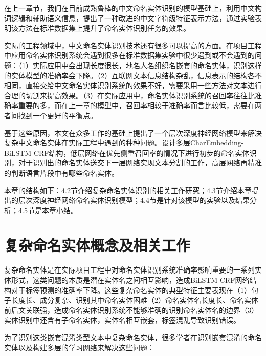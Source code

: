 \documentclass[winfonts,master,oneside,nobackinfo]{njuthesis}
\begin{document}
在上一章节，我们在目前成熟鲁棒的中文命名实体识别的模型基础上，利用中文构词逻辑和辅助语义信息，提出了一种改进的中文字符级特征表示方法，通过实验表明该方法在标准数据集上提升了命名实体识别任务的效果。

实际的工程领域中，中文命名实体识别技术还有很多可以提高的方面。在项目工程中应用命名实体识别系统会遇到很多在标准数据集实验中很少遇到或不会遇到的问题：（1）实际应用中会出现长度很长，地名人名组织名嵌套的命名实体，识别这样的实体模型的准确率会下降。（2）互联网文本信息结构杂乱，信息表示的结构各不相同，直接交给中文命名实体识别系统的效果不好，需要采用一些方法对文本进行合理的切割来提高效果。（3）在实际应用中，命名实体识别系统的召回率往往比准确率重要的多，而在上一章的模型中，召回率相较于准确率而言比较低，需要在两者间找到一个更好的平衡点。

基于这些原因，本文在众多工作的基础上提出了一个层次深度神经网络模型来解决复杂中文命名实体在实际工程中遇到的种种问题。设计多层CharEmbedding-BiLSTM-CRF结构，低层网络在优先侧重召回率的情况下进行初步的命名实体识别，对于识别出的命名实体送交下一层网络实现文本分割的工作，高层网络再精准的判断语言片段中有哪些命名实体。

本章的结构如下：4.2节介绍复杂命名实体识别的相关工作研究；4.3节介绍本章提出的层次深度神经网络命名实体识别模型；4.4节是针对该模型的实验以及结果分析；4.5节是本章小结。





\section{复杂命名实体概念及相关工作}

复杂命名实体是在实际项目工程中对命名实体识别系统准确率影响重要的一系列实体形式，这类问题的本质是潜在实体名之间相互影响，造成BiLSTM-CRF网络结构对于标签预测的准确率下降。这些复杂命名实体的典型特征主要表现在（1）句子长度长、成分复杂、识别其中命名实体困难（2）命名实体名长度长、命名实体前后文关联强，造成命名实体识别系统不能够准确的识别命名实体名的边界（3）实体识别中还含有子命名实体，实体名相互嵌套，标签混乱导致识别错误。

为了识别这类嵌套混淆类型文本中复杂命名实体，很多学者在识别嵌套混淆的命名实体以及构建多层的学习网络来解决这些问题：
\end{document}
